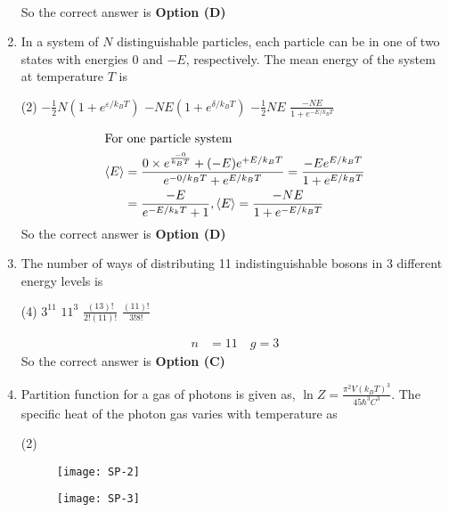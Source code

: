 \begin{enumerate}
\begin{answer}
\begin{align*}
\end{align*}
So the correct answer is \textbf{Option (D)}
\end{answer}
	\item In a system of $N$ distinguishable particles, each particle can be in one of two states with energies 0 and $-E$, respectively. The mean energy of the system at temperature $T$ is
\begin{tasks}(2)
\task[\textbf{A.}] $-\frac{1}{2} N\left(1+e^{\varepsilon / k_{B} T}\right)$
\task[\textbf{B.}] $-N E\left(1+e^{\delta / k_{B} T}\right)$
\task[\textbf{C.}] $-\frac{1}{2} N E$
\task[\textbf{D.}] $\frac{-N E}{1+e^{-E / k_{B} T}}$
\end{tasks}
\begin{answer}
\begin{align*}
\intertext{For one particle system}
\langle E\rangle&=\frac{0 \times e^{\frac{-0}{k_{B} T}}+(-E) e^{+E / k_{B} T}}{e^{-0 / k_{B} T}+e^{E / k_{B} T}}=\frac{-E e^{E / k_{B} T}}{1+e^{E / k_{B} T}}\\&=\frac{-E}{e^{-E / k_{k} T}+1}, \langle E\rangle=\frac{-N E}{1+e^{-E / k_{B} T}}
\end{align*}
So the correct answer is \textbf{Option (D)}
\end{answer}
	\item The number of ways of distributing 11 indistinguishable bosons in 3 different energy levels is
\begin{tasks}(4)
\task[\textbf{A.}]  $3^{11}$
\task[\textbf{B.}] $11^{3}$
\task[\textbf{C.}] $\frac{(13) !}{2 !(11) !}$
\task[\textbf{D.}]  $\frac{(11) !}{3 ! 8 !}$
\end{tasks}
\begin{answer}
\begin{align*}
n&=11 \quad g=3
\end{align*}
So the correct answer is \textbf{Option (C)}
\end{answer}
	\item Partition function for a gas of photons is given as, $\ln Z=\frac{\pi^{2} V\left(k_{B} T\right)^{3}}{45 \hbar^{3} C^{3}}$. The specific heat of the photon gas varies with temperature as
\begin{tasks}(2)
\task[\textbf{A.}] \begin{figure}[H]
	\centering
	\texttt{[image: SP-2]}
\end{figure}
\task[\textbf{B.}] \begin{figure}[H]
	\centering
	\texttt{[image: SP-3]}
\end{figure}

\end{tasks}
\end{enumerate}
